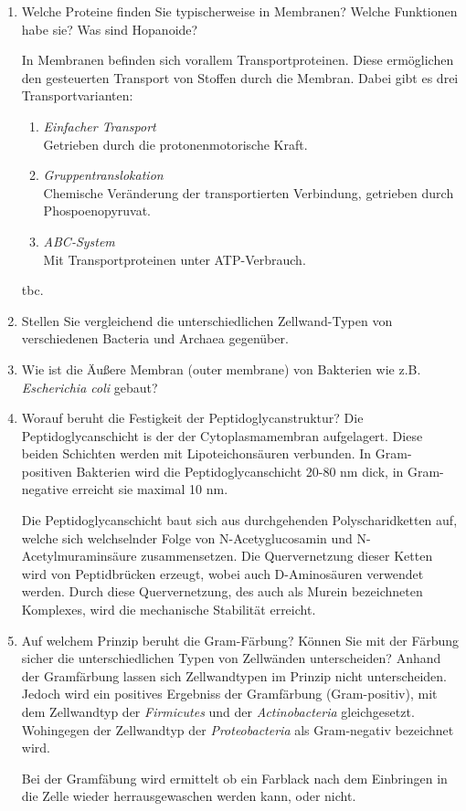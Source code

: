\begin{enumerate}
		\item Welche Proteine finden Sie typischerweise in Membranen? Welche Funktionen habe sie? Was sind Hopanoide?
			
			In Membranen befinden sich vorallem Transportproteinen.
			Diese ermöglichen den gesteuerten Transport von Stoffen durch die Membran.
			Dabei gibt es drei Transportvarianten:
			\begin{enumerate}[label=\arabic*)]
				\item \emph{Einfacher Transport} \hfill \\ 
					Getrieben durch die protonenmotorische Kraft.
				\item \emph{Gruppentranslokation} \hfill \\ 
					Chemische Veränderung der transportierten Verbindung,
					getrieben durch Phospoenopyruvat.
				\item \emph{ABC-System} \hfill \\ 
					Mit Transportproteinen unter ATP-Verbrauch.
			\end{enumerate}

			tbc.

		\item Stellen Sie vergleichend die unterschiedlichen Zellwand-Typen von verschiedenen Bacteria und Archaea gegenüber.
		\item Wie ist die Äußere Membran (outer membrane) von Bakterien wie z.B. \emph{Escherichia coli} gebaut?
		\item Worauf beruht die Festigkeit der Peptidoglycanstruktur? 
			Die Peptidoglycanschicht is der der Cytoplasmamembran aufgelagert.
			Diese beiden Schichten werden mit Lipoteichonsäuren verbunden.
			In Gram-positiven Bakterien wird die Peptidoglycanschicht 20-80 nm dick,
			in Gram-negative erreicht sie maximal 10 nm.

			Die Peptidoglycanschicht baut sich aus durchgehenden Polyscharidketten auf,
			welche sich welchselnder Folge von N-Acetyglucosamin und N-Acetylmuraminsäure zusammensetzen.
			Die Quervernetzung dieser Ketten wird von Peptidbrücken erzeugt,
			wobei auch D-Aminosäuren verwendet werden.
			Durch diese Quervernetzung,
			des auch als Murein bezeichneten Komplexes,
			wird die mechanische Stabilität erreicht.


		\item Auf welchem Prinzip beruht die Gram-Färbung? Können Sie mit der Färbung sicher die unterschiedlichen Typen von Zellwänden unterscheiden?
			Anhand der Gramfärbung lassen sich Zellwandtypen im Prinzip nicht unterscheiden.
			Jedoch wird ein positives Ergebniss der Gramfärbung (Gram-positiv),
			mit dem Zellwandtyp der \emph{Firmicutes} und der \emph{Actinobacteria} gleichgesetzt.
			Wohingegen der Zellwandtyp der \emph{Proteobacteria} als Gram-negativ bezeichnet wird.

			Bei der Gramfäbung wird ermittelt ob ein Farblack nach dem Einbringen in die Zelle wieder herrausgewaschen werden kann,
			oder nicht.
	\end{enumerate}

